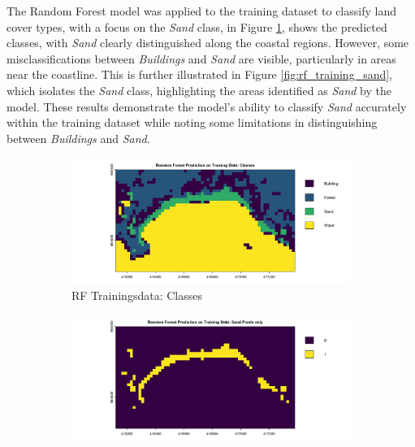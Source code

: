 \documentclass[a4paper,12pt]{article}
\begin{document}
The Random Forest model was applied to the training dataset to classify land cover types, with a focus on the \textit{Sand} class, in Figure \ref{fig:rf_training_classes}, shows the predicted classes, with \textit{Sand} clearly distinguished along the coastal regions. However, some misclassifications between \textit{Buildings} and \textit{Sand} are visible, particularly in areas near the coastline. This is further illustrated in Figure \ref{fig:rf_training_sand}, which isolates the \textit{Sand} class, highlighting the areas identified as \textit{Sand} by the model. These results demonstrate the model’s ability to classify \textit{Sand} accurately within the training dataset while noting some limitations in distinguishing between \textit{Buildings} and \textit{Sand}.
\begin{figure}[H]
    \centering
    \begin{subfigure}[b]{0.48\linewidth} %
        \centering
        \includegraphics[width=\linewidth]{Random_Forest_Model/Random Forest Prediction on Training Data: Classes.png}
        \caption{RF Trainingsdata: Classes}
        \label{fig:rf_training_classes}
    \end{subfigure}
    \hspace{0.02\linewidth} %
    \begin{subfigure}[b]{0.48\linewidth}
        \centering
        \includegraphics[width=\linewidth]{Random_Forest_Model/Random Forest Prediction on Training Data: Sand only.png}

\end{subfigure}
\end{figure}
\end{document}
